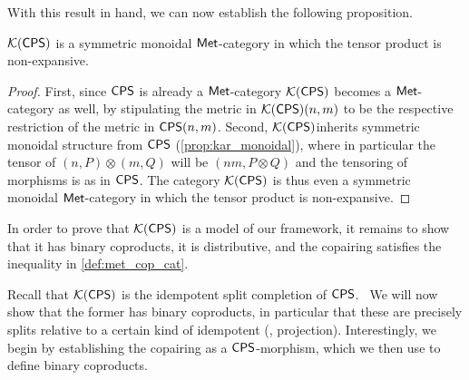 With this result in hand, we can now establish the following proposition.

\begin{proposition} \label{prop:kar_monoidal_met}
  $\mathcal{K}{(\mathsf{CPS})}$ is a symmetric monoidal $\mathsf{Met}$-category in which the tensor product is non-expansive.
\end{proposition}

\begin{proof}
 First, since $\mathsf{CPS}$ is already a $\mathsf{Met}$-category $\mathcal{K}{(\mathsf{CPS})}$ becomes
a $\mathsf{Met}$-category as well, by stipulating the metric in $\mathcal{K}{(\mathsf{CPS})}(n,m)$ to be
the respective restriction of the metric in $\mathsf{CPS}(n,m)$. 
Second, $\mathcal{K}{(\mathsf{CPS})}$inherits symmetric monoidal structure from $\mathsf{CPS}$ (\autoref{prop:kar_monoidal}), where in particular the tensor of
$(n,P) \otimes (m,Q)$ will be $(n m , P \otimes Q)$ and the tensoring of
morphisms is as in $\mathsf{CPS}$. The category $\mathcal{K}{(\mathsf{CPS})}$ is thus even a
symmetric monoidal $\mathsf{Met}$-category in which the tensor product is non-expansive. 
\end{proof}

In order to prove that $\mathcal{K}{(\mathsf{CPS})}$ is a model of our framework, it remains to show that it has binary coproducts, it is distributive, and the copairing satisfies the inequality in \autoref{def:met_cop_cat}.

Recall that $\mathcal{K}{(\mathsf{CPS})}$ is the idempotent split completion of $\mathsf{CPS}$.  We will now show that the former has binary coproducts, in particular that these are precisely splits relative to a certain kind of idempotent (\ie, projection).
Interestingly, we begin by establishing the copairing as a $\mathsf{CPS}$-morphism, which we then use to define binary coproducts. 

